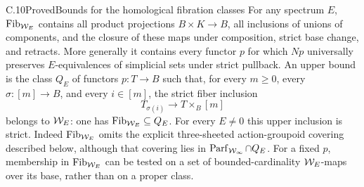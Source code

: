 \begin{claim}{C.10}{Proved}{Bounds for the homological fibration classes}
For any spectrum $E$, $\operatorname{Fib}_{\mathcal{W}_E}$ contains all product projections
$B\times K\to B$, all inclusions of unions of components, and the
closure of these maps under composition, strict base change, and
retracts. More generally it contains every functor $p$ for which
$Np$ universally preserves $E$-equivalences of simplicial sets
under strict pullback. An upper bound is the class $Q_E$ of
functors $p:T\to B$ such that, for every $m\geq0$, every
$\sigma:[m]\to B$, and every $i\in[m]$, the strict fiber inclusion
\[
 T_{\sigma(i)}\longrightarrow T\times_B[m]
\]
belongs to $\mathcal{W}_E$: one has $\operatorname{Fib}_{\mathcal{W}_E}\subseteq Q_E$.
For every $E\neq0$ this upper inclusion is strict.
Indeed $\operatorname{Fib}_{\mathcal{W}_E}$ omits the explicit
three-sheeted action-groupoid covering described below, although
that covering lies in $\operatorname{Parf}_{\mathcal{W}_{\infty}}\cap Q_E$.
For a fixed $p$, membership in $\operatorname{Fib}_{\mathcal{W}_E}$ can be tested on a set
of bounded-cardinality $\mathcal{W}_E$-maps over its base, rather than on a
proper class.
\end{claim}
